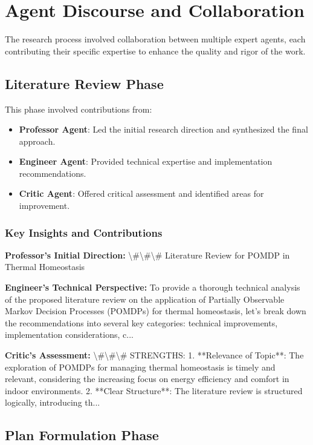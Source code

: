 \documentclass[11pt,a4paper]{article}
\begin{document}
\section{Agent Discourse and Collaboration}

The research process involved collaboration between multiple expert agents, each contributing their specific expertise to enhance the quality and rigor of the work.


\subsection{Literature Review Phase}


This phase involved contributions from:

\begin{itemize}
\item \textbf{Professor Agent}: Led the initial research direction and synthesized the final approach.
\item \textbf{Engineer Agent}: Provided technical expertise and implementation recommendations.
\item \textbf{Critic Agent}: Offered critical assessment and identified areas for improvement.
\end{itemize}

\subsubsection{Key Insights and Contributions}


\textbf{Professor's Initial Direction:} \textbackslash{}#\textbackslash{}#\textbackslash{}# Literature Review for POMDP in Thermal Homeostasis


\textbf{Engineer's Technical Perspective:} To provide a thorough technical analysis of the proposed literature review on the application of Partially Observable Markov Decision Processes (POMDPs) for thermal homeostasis, let's break down the recommendations into several key categories: technical improvements, implementation considerations, c...


\textbf{Critic's Assessment:} \textbackslash{}#\textbackslash{}#\textbackslash{}# STRENGTHS:
1. **Relevance of Topic**: The exploration of POMDPs for managing thermal homeostasis is timely and relevant, considering the increasing focus on energy efficiency and comfort in indoor environments.
2. **Clear Structure**: The literature review is structured logically, introducing th...


\subsection{Plan Formulation Phase}
\end{document}
